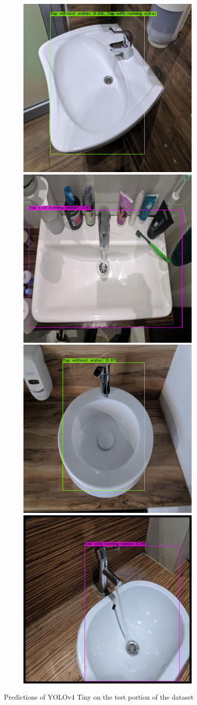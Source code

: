 \documentclass[journal,onecolumn]{IEEEtran}
\begin{document}
\begin{figure}[htb]
    \centering
    \begin{subfigure}[b]{\textwidth}
        \centering
        \includegraphics[width=0.475\linewidth]{figures/yolov4-prediction-1.jpg}%
        \hfill
        \includegraphics[width=0.475\linewidth]{figures/yolov4-prediction-2.jpg}%
        \hfill
        \includegraphics[width=0.475\linewidth]{figures/yolov4-prediction-3.jpg}%
        \hfill
        \includegraphics[width=0.475\linewidth]{figures/yolov4-prediction-4.jpg}%
        \hfill
    \end{subfigure}
    \caption{Predictions of YOLOv4 Tiny on the test portion of the dataset}
\end{figure}
\end{document}
